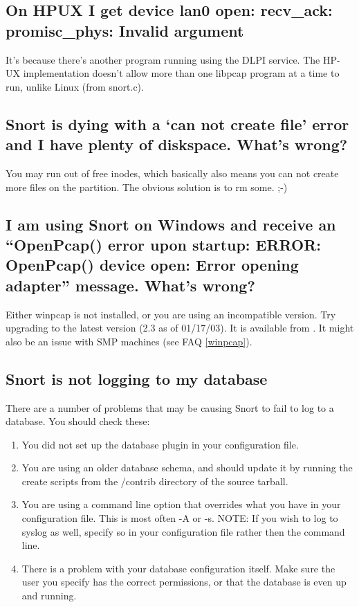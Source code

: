 \documentclass{article}
\newcommand{\myref}[1]{(see FAQ \ref{#1})}
\begin{document}
\subsection{On HPUX I get device lan0 open: recv\_ack: promisc\_phys: Invalid argument}

It's because there's another program running using the DLPI service.
The HP-UX implementation doesn't allow more than one libpcap program
at a time to run, unlike Linux (from snort.c).

\subsection{Snort is dying with a `can not create file' error and I have plenty of diskspace. What's wrong?}

You may run out of free inodes, which basically also means you can not create
more files on the partition. The obvious solution is to rm some. ;-)

\subsection{I am using Snort on Windows and receive an ``OpenPcap() error upon startup: ERROR: OpenPcap() device open: Error opening adapter'' message. What's wrong? }

Either winpcap is not installed, or you are using an incompatible version.
Try upgrading to the latest version (2.3 as of 01/17/03).  It is available 
from .
It might also be an issue with SMP machines \myref{winpcap}.

\subsection{Snort is not logging to my database}

There are a number of problems that may be causing Snort to fail to log to a 
database.  You should check these:
\begin{enumerate}
\item You did not set up the database plugin in your configuration file.
\item  You are using an older database schema, and should update it by running the create scripts from the /contrib directory of the source tarball.
\item You are using a command line option that overrides what you have in your configuration file.  This is most often -A or -s.  NOTE: If you wish to log to syslog as well, specify so in your configuration file rather then the command line.
\item There is a problem with your database configuration itself.  Make sure the user you specify has the correct permissions, or that the database is even up and running.
\end{enumerate}
\end{document}
